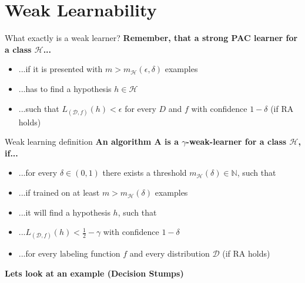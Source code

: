 \section{Weak Learnability}

\begin{frame}{What exactly is a weak learner?} \pause
    \textbf{Remember, that a strong PAC learner for a class $\mathcal{H}$...} \pause
    \begin{itemize}
        \item ...if it is presented with $m > m_\mathcal{H}(\epsilon, \delta)$ examples \pause
        \item ...has to find a hypothesis $h \in \mathcal{H}$ \pause
        \item ...such that $L_{(\mathcal{D}, f)}(h) < \epsilon$ for every $D$ and $f$ with confidence $1 - \delta$ (if RA holds) \pause
    \end{itemize}
    \vspace{0.5cm}
    \centering
\end{frame}

\begin{frame}{Weak learning definition}
    \textbf{An algorithm A is a $\gamma$-weak-learner for a class $\mathcal{H}$, if...} \pause
    \begin{itemize}
        \item ...for every $\delta \in (0, 1)$ there exists a threshold 
            $m_{\mathcal{H}}(\delta) \in \mathbb{N}$, such that \pause
        \item ...if trained on at least $m > m_{\mathcal{H}}(\delta)$ examples \pause
        \item ...it will find a hypothesis $h$, such that \pause
        \item ...$L_{(\mathcal{D}, f)}(h) < \frac{1}{2} - \gamma$
            with confidence $1 - \delta$ \pause
        \item ...for every labeling function $f$ and every distribution $\mathcal{D}$
            (if RA holds) \pause
    \end{itemize}
    \textbf{Lets look at an example (Decision Stumps)}
\end{frame}


